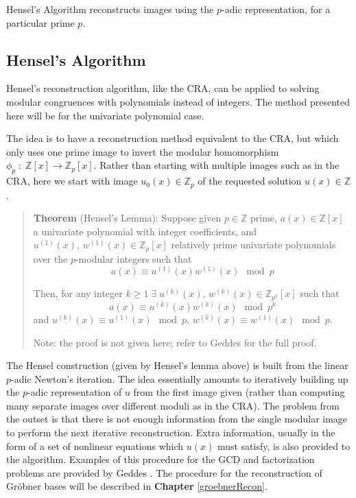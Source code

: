 \documentclass[letterpaper,12pt,titlepage,oneside,final]{book}
\newenvironment{theorem}{\begin{quote}%
  \textbf{Theorem }%
  \quad
}{%
\end{quote}%
}
\begin{document}
Hensel's Algorithm reconstructs images using the ${p}$-adic representation, for a particular prime ${p}$.

\subsection{Hensel's Algorithm}

Hensel's reconstruction algorithm, like the CRA, can be applied to solving modular congruences with polynomials instead of integers.  The method presented here will be for the univariate polynomial case.  

The idea is to have a reconstruction method equivalent to the CRA, but which only uses one prime image to invert the modular homomorphism ${\phi_p\; : \; \mathbb{Z}[x] \rightarrow \mathbb{Z}_p[x]}$.  Rather than starting with multiple images such as in the CRA, here we start with image ${u_0(x) \in \mathbb{Z}_p}$ of the requested solution ${u(x) \in \mathbb{Z}}$.

\begin{theorem}\label{hensel's lemma}
  (Hensel's Lemma): Suppose given ${p \in \mathbb{Z}}$ prime, ${a(x) \in \mathbb{Z}[x]}$ a univariate polynomial with integer coefficients, and ${u^{(1)}(x),\, w^{(1)}(x) \in \mathbb{Z}_p[x]}$ relatively prime univariate polynomials over the ${p}$-modular integers such that
  \begin{equation*}
    a(x) \equiv u^{(1)}(x)w^{(1)}(x) \mod p
  \end{equation*}

  Then, for any integer ${k \geq 1 \; \exists \; u^{(k)}(x),\, w^{(k)}(x) \in \mathbb{Z}_{p^k}[x]}$ such that 
  \begin{equation*}
    a(x) \equiv u^{(k)}(x)w^{(k)}(x) \mod p^k
  \end{equation*}
  and ${u^{(k)}(x) \equiv u^{(1)}(x) \mod p}$, ${w^{(k)}(x) \equiv w^{(1)}(x) \mod p}$. 

  Note: the proof is not given here; refer to Geddes \cite{Geddes} for the full proof.
\end{theorem}           

The Hensel construction (given by Hensel's lemma above) is built from the linear ${p}$-adic Newton's iteration.  The idea essentially amounts to iteratively building up the ${p}$-adic representation of ${u}$ from the first image given (rather than computing many separate images over different moduli as in the CRA).  The problem from the outset is that there is not enough information from the single modular image to perform the next iterative reconstruction.  Extra information, usually in the form of a set of nonlinear equations which ${u(x)}$ must satisfy, is also provided to the algorithm.  Examples of this procedure for the GCD and factorization problems are provided by Geddes \cite{Geddes}.  The procedure for the reconstruction of Gr\"obner bases will be described in \textbf{Chapter} \ref{groebnerRecon}. 
\end{document}

